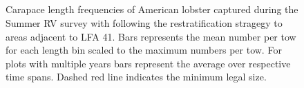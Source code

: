 \documentclass[11pt]{article}
\newcommand{\D}{.}
\newcommand{\e}{/backup/bio_data/bio.lobster/figures/} %
\begin{document}
\begin{figure}
\centering

\\
\\
\\
\\
 \caption{Carapace length frequencies of American lobster captured during the Summer RV survey with following the restratification stragegy to areas adjacent to LFA 41. Bars represents the mean number per tow for each length bin scaled to the maximum numbers per tow. For plots with multiple years bars represent the average over respective time spans. Dashed red line indicates the minimum legal size.}
\end{figure}
\clearpage
\end{document}
